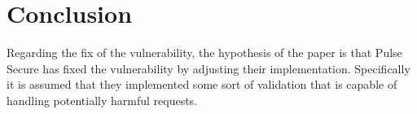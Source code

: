 
\section{Conclusion}

Regarding the fix of the vulnerability, the hypothesis of the paper is that Pulse Secure has fixed the vulnerability by adjusting their implementation. Specifically it is assumed that they implemented some sort of validation that is capable of handling potentially harmful requests.